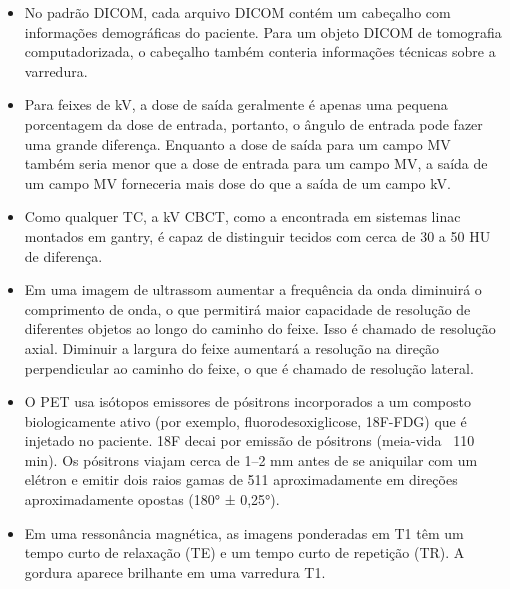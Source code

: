 \documentclass[11pt,a4paper]{article}
\newcounter{exemplo}
\begin{document}
\begin{exemplo}[Imagens]
    \begin{itemize}
        \item No padrão DICOM, cada arquivo DICOM contém um cabeçalho com informações demográficas do paciente. Para um objeto DICOM de tomografia computadorizada, o cabeçalho também conteria informações técnicas sobre a varredura.
        
        \item Para feixes de kV, a dose de saída geralmente é apenas uma pequena porcentagem da dose de entrada, portanto, o ângulo de entrada pode fazer uma grande diferença. Enquanto a dose de saída para um campo MV também seria menor que a dose de entrada para um campo MV, a saída de um campo MV forneceria mais dose do que a saída de um campo kV. 
        
        \item Como qualquer TC, a kV CBCT, como a encontrada em sistemas linac montados em gantry, é capaz de distinguir tecidos com cerca de 30 a 50 HU de diferença.

        \item Em uma imagem de ultrassom aumentar a frequência da onda diminuirá o comprimento de onda, o que permitirá maior capacidade de resolução de diferentes objetos ao longo do caminho do feixe. Isso é chamado de resolução axial. Diminuir a largura do feixe aumentará a resolução na direção perpendicular ao caminho do feixe, o que é chamado de resolução lateral.
        
        \item O PET usa isótopos emissores de pósitrons incorporados a um composto biologicamente ativo (por exemplo, fluorodesoxiglicose, 18F-FDG) que é injetado no paciente. 18F decai por emissão de pósitrons (meia-vida ~110 min). Os pósitrons viajam cerca de 1–2 mm antes de se aniquilar com um elétron e emitir dois raios gamas de 511 aproximadamente em direções aproximadamente opostas (180° ± 0,25°).
        
        \item Em uma ressonância magnética, as imagens ponderadas em T1 têm um tempo curto de relaxação (TE) e um tempo curto de repetição (TR). A gordura aparece brilhante em uma varredura T1.
        

\end{itemize}
\end{exemplo}
\end{document}
